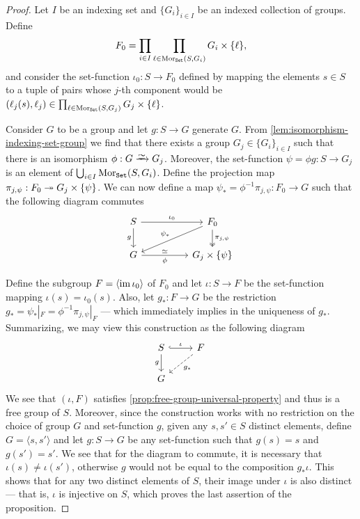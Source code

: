 \begin{proof}
    Let \(I\) be an indexing set and \(\{G_{i}\}_{i \in I}\) be an indexed
    collection of groups. Define
    \[
        F_0 = \prod_{i \in I} \prod_{\ell \in \operatorname{Mor}_{{\texttt{Set}}}(S, G_i)} G_i \times \{\ell\},
    \]
    and consider the set-function \(\iota_0: S \to F_0\) defined by mapping the
    elements \(s \in S\) to a tuple of pairs whose \(j\)-th component would be
    \((\ell_j(s), \ell_j) \in \prod_{\ell \in \operatorname{Mor}_{{\texttt{Set}}}(S, G_j)} G_j \times
    \{\ell\}\).

    Consider \(G\) to be a group and let \(g: S \to G\) generate \(G\). From
    \cref{lem:isomorphism-indexing-set-group} we find that there exists a group
    \(G_j \in \{G_{i}\}_{i \in I}\) such that there is an isomorphism \(\phi: G
    \isoto G_{j}\). Moreover, the set-function \(\psi = \phi g: S \to G_j\) is an
    element of \(\bigcup_{i \in I} \operatorname{Mor}_{{\texttt{Set}}}(S, G_i)\). Define the projection map
    \(\pi_{j, \psi}: F_0 \twoheadrightarrow G_j \times \{\psi\}\). We can now define a map
    \(\psi_{*} = \phi^{-1} \pi_{j, \psi}: F_0 \to G\) such that the following
    diagram commutes
    \[
        \begin{tikzcd}
            S \ar[rr, "\iota_0"] \ar[d, swap, "g"]
            & &F_0 \ar[d, two heads, "\pi_{j, \psi}"]
            \ar[dll, swap, "\psi_{*}"] \\
            G \ar[rr, swap, "\phi", "\iso"'] & &G_j \times \{\psi\}
        \end{tikzcd}
    \]

    Define the subgroup \(F = \left\langle \operatorname{im} \iota_{0} \right\rangle\) of \(F_0\)
    and let \(\iota: S \to F\) be the set-function mapping \(\iota(s) =
    \iota_0(s)\). Also, let \(g_{*}: F \to G\) be the restriction \(g_{*} =
    \psi_{*}|_{F} = \phi^{-1} \pi_{j, \psi}|_{F}\) --- which immediately implies in
    the uniqueness of \(g_{*}\). Summarizing, we may view this construction as the
    following diagram
    \[
        \begin{tikzcd}
            S \ar[r, hook, "\iota"] \ar[d, swap, "g"] &F \ar[dl, dashed, "g_{*}"] \\
            G &
        \end{tikzcd}
    \]
    We see that \((\iota, F)\) satisfies \cref{prop:free-group-universal-property}
    and thus is a free group of \(S\). Moreover, since the construction works with
    no restriction on the choice of group \(G\) and set-function \(g\), given any
    \(s, s' \in S\) distinct elements, define \(G = \langle s, s' \rangle\) and let
    \(g: S \to G\) be any set-function such that \(g(s) = s\) and \(g(s') = s'\). We
    see that for the diagram to commute, it is necessary that \(\iota(s) \neq
    \iota(s')\), otherwise \(g\) would not be equal to the composition \(g_{*}
    \iota\). This shows that for any two distinct elements of \(S\), their image
    under \(\iota\) is also distinct --- that is, \(\iota\) is injective on \(S\),
    which proves the last assertion of the proposition.
\end{proof}

